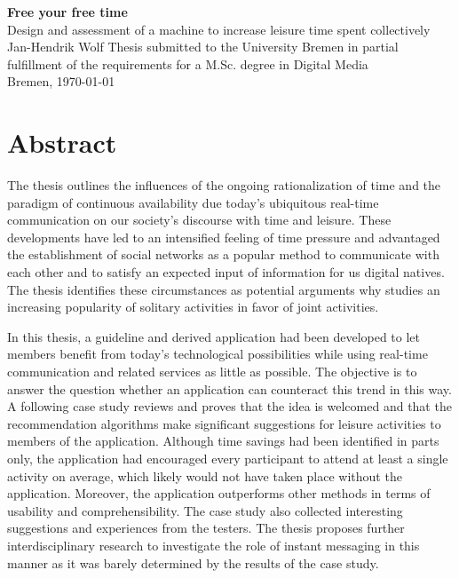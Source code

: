 \documentclass[12pt,numbers=noenddot,parskip,bibliography=totocnumbered,listof=totocnumbered,draft]{scrreprt}
\begin{document}
\begin{titlepage}
\null
\vfill

\Huge\textbf{Free your free time}
\bigskip\\
\LARGE{Design and assessment of a machine to increase leisure time spent collectively} %
\medskip\\
\Large{Jan-Hendrik Wolf}
\vfill
\vfill
\vfill
\small{Thesis submitted to the University Bremen in partial fulfillment of the requirements for a M.Sc. degree in Digital Media\\
Bremen, \today}
\end{titlepage}


\tableofcontents

\chapter*{Abstract}
The thesis outlines the influences of the ongoing rationalization of time and the paradigm of continuous availability due today's ubiquitous real-time communication on our society's discourse with time and leisure. These developments have led to an intensified feeling of time pressure and advantaged the establishment of social networks as a popular method to communicate with each other and to satisfy an expected input of information for us digital natives. The thesis identifies these circumstances as potential arguments why studies an increasing popularity of solitary activities in favor of joint activities.

In this thesis, a guideline and derived application had been developed to let members benefit from today's technological possibilities while using real-time communication and related services as little as possible. The objective is to answer the question whether an application can counteract this trend in this way. A following case study reviews and proves that the idea is welcomed and that the recommendation algorithms make significant suggestions for leisure activities to members of the application. Although time savings had been identified in parts only, the application had encouraged every participant to attend at least a single activity on average, which likely would not have taken place without the application. Moreover, the application outperforms other methods in terms of usability and comprehensibility. The case study also collected interesting suggestions and experiences from the testers. The thesis proposes further interdisciplinary research to investigate the role of instant messaging in this manner as it was barely determined by the results of the case study.
\end{document}
